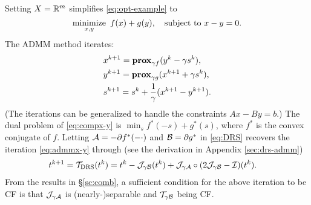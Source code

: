 {\DIFdelbegin %
\DIFdelend \DIFaddbegin \begin{example}\DIFaddend \label{alg:admm} Setting $X=\mathbb{R}^m$ simplifies \eqref{eq:opt-example} to 
\begin{equation}\label{eq:compx-y}
\Min_{x,y}~f(x)+g(y),\quad\St~ x-y=0.
\end{equation} 
The ADMM method iterates:
\begin{subequations}\label{eq:admmx-y}
\begin{align}
&x^{k+1}=\prox_{\gamma f}(y^k-\gamma s^k),\\%
&y^{k+1}=\prox_{\gamma g}(x^{k+1}+\gamma s^{k}),\\%
&s^{k+1}=s^k+\frac{1}{\gamma}(x^{k+1}-y^{k+1}).
\end{align}
\end{subequations}
(The iterations can be generalized to handle the constraints $Ax-By=b$.) The dual problem of \eqref{eq:compx-y} is $\min_s f^*(-s)+g^*(s)$, where $f^*$ is the convex conjugate of $f$. Letting ${\mathcal{A}}=-\partial f^*(-\cdot)$ and ${\mathcal{B}}=\partial g^*$ in \eqref{eq:DRS} recovers the iteration  \eqref{eq:admmx-y} through (see the derivation in Appendix \ref{sec:drs-admm})
\begin{align*}
&t^{k+1}=\TDRS(t^k)=t^k-\cJ_{\gamma \cB}(t^k)+\cJ_{\gamma\cA}\circ(2\cJ_{\gamma \cB}-\cI)(t^k).
\end{align*}  %
From the results in \S\ref{sc:comb}, a sufficient condition for the above iteration to be CF is that ${\mathcal{J}}_{\gamma{\mathcal{A}}}$ is (nearly-)separable and ${\mathcal{T}}_{\gamma{\mathcal{B}}}$ being CF. 
\end{example}


}
